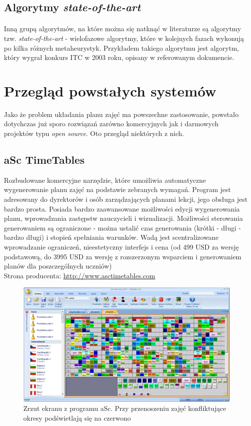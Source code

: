 \subsection{Algorytmy \textit{state-of-the-art}}
\paragraph{} Inną grupą algorytmów, na które można się natknąć w literaturze są algorytmy tzw. \textit{state-of-the-art} - wielofazowe algorytmy, które w kolejnych fazach wykonują po kilka różnych metaheurystyk. Przykładem takiego algorytmu jest algorytm, który wygrał konkurs ITC w 2003 roku, opisany w referowanym dokumencie\cite{kostuch}.


\section{Przegląd powstałych systemów}
Jako że problem układania planu zajęć ma powszechne zastosowanie, powstało dotychczas już sporo rozwiązań zarówno komercyjnych jak i darmowych projektów typu \emph{open source}. Oto przegląd niektórych z nich.
\subsection{aSc TimeTables}
Rozbudowane komercyjne narzędzie, które umożliwia automatyczne wygenerowanie planu zajęć na podstawie zebranych wymagań. Program jest adresowany do dyrektorów i osób zarządzających planami lekcji, jego obsługa jest bardzo prosta. Posiada bardzo zaawansowane możliwości edycji wygenerowania planu, wprowadzania zastępstw nauczycieli i wizualizacji. Możliwości sterowania generowaniem są ograniczone - można ustalić czas generowania (krótki - długi - bardzo długi) i stopień spełniania warunków. Wadą jest scentralizowane wprowadzanie ograniczeń, nieestetyczny interfejs i cena 
(od 499 USD za wersję podstawową, do 3995 USD za wersję z rozszerzonym wsparciem i generowaniem planów dla poszczególnych uczniów) \\
Strona producenta: \url{http://www.asctimetables.com}
\begin{figure}[H]
\includegraphics[width=15cm]{img/asc2.png}
\caption{Zrzut ekranu z programu aSc. Przy przenoszeniu zajęć konfliktujące okresy podświetlają się na czerwono}
\end{figure}

